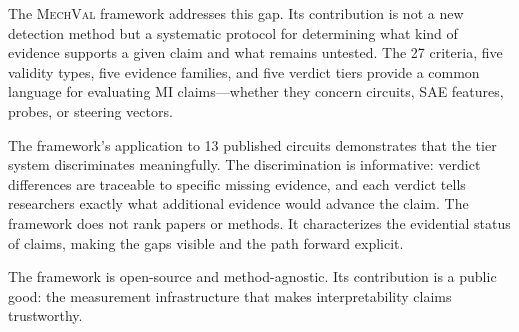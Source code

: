 \documentclass[10pt]{article}
\newcommand{\mechval}{\textsc{MechVal}}
\begin{document}
The \mechval{} framework addresses this gap. Its contribution is not a new detection method but a systematic protocol for determining what kind of evidence supports a given claim and what remains untested. The 27 criteria, five validity types, five evidence families, and five verdict tiers provide a common language for evaluating MI claims---whether they concern circuits, SAE features, probes, or steering vectors.

The framework's application to 13 published circuits demonstrates that the tier system discriminates meaningfully. The discrimination is informative: verdict differences are traceable to specific missing evidence, and each verdict tells researchers exactly what additional evidence would advance the claim. The framework does not rank papers or methods. It characterizes the evidential status of claims, making the gaps visible and the path forward explicit.

The framework is open-source and method-agnostic. Its contribution is a public good: the measurement infrastructure that makes interpretability claims trustworthy.

% 
% 

\end{document}
